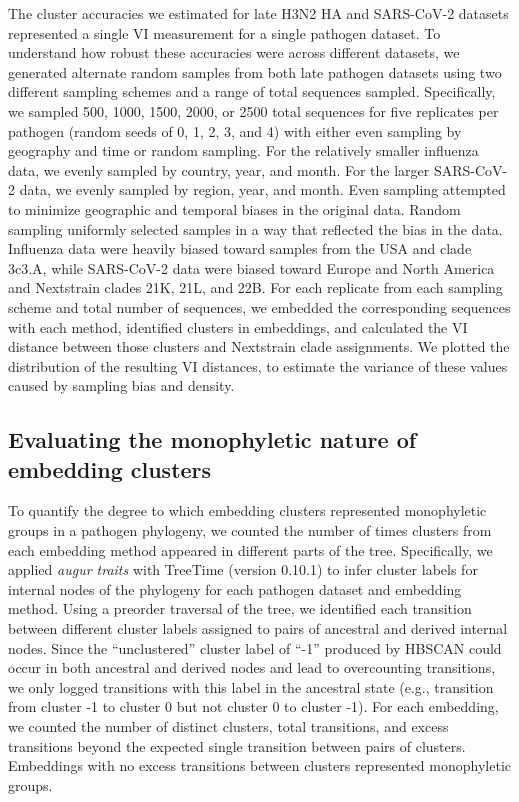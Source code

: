 \documentclass[10pt,letterpaper]{article}
\begin{document}
The cluster accuracies we estimated for late H3N2 HA and SARS-CoV-2 datasets represented a single VI measurement for a single pathogen dataset.
To understand how robust these accuracies were across different datasets, we generated alternate random samples from both late pathogen datasets using two different sampling schemes and a range of total sequences sampled.
Specifically, we sampled 500, 1000, 1500, 2000, or 2500 total sequences for five replicates per pathogen (random seeds of 0, 1, 2, 3, and 4) with either even sampling by geography and time or random sampling.
For the relatively smaller influenza data, we evenly sampled by country, year, and month.
For the larger SARS-CoV-2 data, we evenly sampled by region, year, and month.
Even sampling attempted to minimize geographic and temporal biases in the original data.
Random sampling uniformly selected samples in a way that reflected the bias in the data.
Influenza data were heavily biased toward samples from the USA and clade 3c3.A, while SARS-CoV-2 data were biased toward Europe and North America and Nextstrain clades 21K, 21L, and 22B.
For each replicate from each sampling scheme and total number of sequences, we embedded the corresponding sequences with each method, identified clusters in embeddings, and calculated the VI distance between those clusters and Nextstrain clade assignments.
We plotted the distribution of the resulting VI distances, to estimate the variance of these values caused by sampling bias and density.

\subsection*{Evaluating the monophyletic nature of embedding clusters}

To quantify the degree to which embedding clusters represented monophyletic groups in a pathogen phylogeny, we counted the number of times clusters from each embedding method appeared in different parts of the tree.
Specifically, we applied \textit{augur traits} with TreeTime (version 0.10.1) \cite{Sagulenko2018,Huddleston2021} to infer cluster labels for internal nodes of the phylogeny for each pathogen dataset and embedding method.
Using a preorder traversal of the tree, we identified each transition between different cluster labels assigned to pairs of ancestral and derived internal nodes.
Since the ``unclustered'' cluster label of ``-1'' produced by HBSCAN could occur in both ancestral and derived nodes and lead to overcounting transitions, we only logged transitions with this label in the ancestral state (e.g., transition from cluster -1 to cluster 0 but not cluster 0 to cluster -1).
For each embedding, we counted the number of distinct clusters, total transitions, and excess transitions beyond the expected single transition between pairs of clusters.
Embeddings with no excess transitions between clusters represented monophyletic groups.
\end{document}
